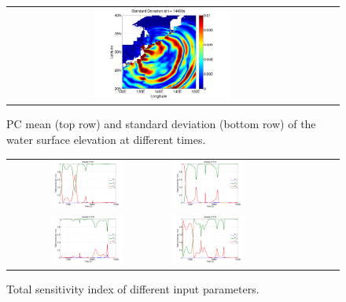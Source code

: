 \documentclass[review,12pt]{elsarticle}
\begin{document}
\begin{figure}[ht]
\begin{tabular}{ccc}
\hspace*{-45pt}
\includegraphics[width=0.45\textwidth]{Figure9f.pdf}
\end{tabular}
\caption{PC mean (top row) and standard deviation (bottom row) of the water surface elevation at different times.}
\label{fig:mean2d}
\end{figure}

\begin{figure}[ht]
\begin{tabular}{clc}
\includegraphics[width=0.475\textwidth]{Figure10a.pdf} &
\includegraphics[width=0.475\textwidth]{Figure10b.pdf} \\
\includegraphics[width=0.475\textwidth]{Figure10c.pdf} &
\includegraphics[width=0.475\textwidth]{Figure10d.pdf}
\end{tabular}
\caption{Total sensitivity index of different input parameters.}
\label{fig:sens}
\end{figure}
\end{document}
